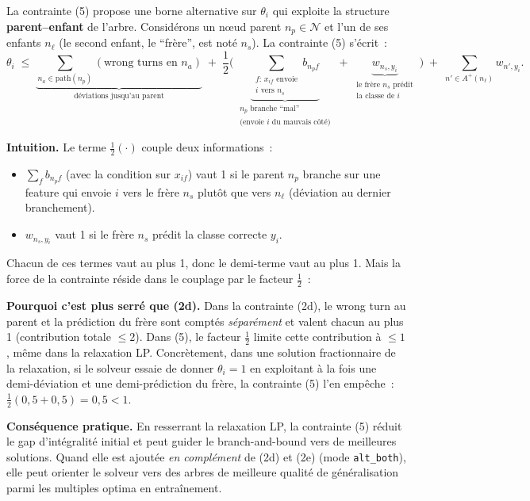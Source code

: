 \documentclass[a4paper,10pt,titlepage,leqno]{article}
\begin{document}
\begin{theorybox}

La contrainte (5) propose une borne alternative sur $\theta_i$ qui exploite la structure \textbf{parent--enfant} de l'arbre. Considérons un nœud parent $n_p \in \mathcal{N}$ et l'un de ses enfants $n_\ell$ (le second enfant, le ``frère'', est noté $n_s$). La contrainte (5) s'écrit~:
\[
  \theta_i \;\leq\; \underbrace{\sum_{n_a \in \text{path}(n_p)} (\text{wrong turns en } n_a)}_{\text{déviations jusqu'au parent}} \;+\; \frac{1}{2}\biggl(\; \underbrace{\sum_{\substack{f:\, x_{if} \text{ envoie}\\ i \text{ vers } n_s}} b_{n_p f}}_{\substack{\text{$n_p$ branche ``mal''}\\\text{(envoie $i$ du mauvais côté)}}} \;+\; \underbrace{w_{n_s, y_i}}_{\substack{\text{le frère $n_s$ prédit}\\\text{la classe de $i$}}} \;\biggr) \;+\; \sum_{n' \in A^+(n_\ell)} w_{n', y_i}.
\]

\textbf{Intuition.} Le terme $\frac{1}{2}(\cdot)$ couple deux informations~:
\begin{itemize}
  \item $\sum_{f} b_{n_p f}$ (avec la condition sur $x_{if}$) vaut 1 si le parent $n_p$ branche sur une feature qui envoie $i$ vers le frère $n_s$ plutôt que vers $n_\ell$ (déviation au dernier branchement).
  \item $w_{n_s, y_i}$ vaut 1 si le frère $n_s$ prédit la classe correcte $y_i$.
\end{itemize}
Chacun de ces termes vaut au plus 1, donc le demi-terme vaut au plus 1. Mais la force de la contrainte réside dans le couplage par le facteur $\frac{1}{2}$~:

\medskip

\textbf{Pourquoi c'est plus serré que (2d).} Dans la contrainte (2d), le wrong turn au parent et la prédiction du frère sont comptés \emph{séparément} et valent chacun au plus 1 (contribution totale $\leq 2$). Dans (5), le facteur $\frac{1}{2}$ limite cette contribution à $\leq 1$, même dans la relaxation LP. Concrètement, dans une solution fractionnaire de la relaxation, si le solveur essaie de donner $\theta_i = 1$ en exploitant à la fois une demi-déviation et une demi-prédiction du frère, la contrainte (5) l'en empêche~: $\frac{1}{2}(0{,}5 + 0{,}5) = 0{,}5 < 1$.

\medskip

\textbf{Conséquence pratique.} En resserrant la relaxation LP, la contrainte (5) réduit le gap d'intégralité initial et peut guider le branch-and-bound vers de meilleures solutions. Quand elle est ajoutée \emph{en complément} de (2d) et (2e) (mode \texttt{alt\_both}), elle peut orienter le solveur vers des arbres de meilleure qualité de généralisation parmi les multiples optima en entraînement.
\end{theorybox}
\end{document}
